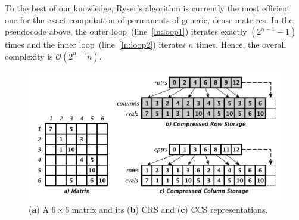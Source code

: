 \documentclass{elektr}
\begin{document}
\begin{minipage}{0.3\textwidth}
\end{minipage}

To the best of our knowledge, Ryser's algorithm is currently the most efficient one for the exact computation of permanents of generic, dense matrices. In the pseudocode above, the outer loop~(line~\ref{ln:loop1}) iterates exactly $(2^{n-1}-1)$ times and the inner loop~(line~\ref{ln:loop2}) iterates $n$ times. Hence, the overall complexity is $\mathcal{O}(2^{n-1}n)$.

\begin{figure}[H]
\begin{center}
\includegraphics[width=0.7\linewidth]{fig1.pdf}
\caption{({\bf a}) A $6 \times 6$ matrix and its ({\bf b}) CRS and ({\bf c}) CCS representations.}
\label{fig:mat}
\end{center}
\end{figure}
\end{document}
